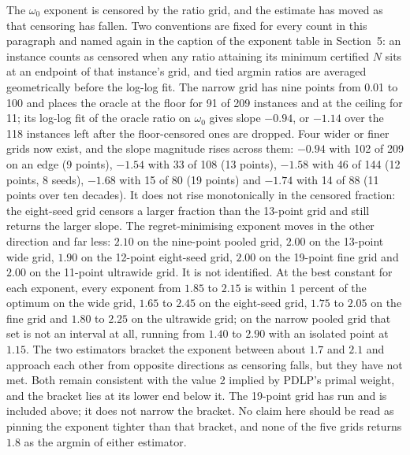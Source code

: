 The $\omega_0$ exponent is censored by the ratio grid, and the estimate has
moved as that censoring has fallen. Two conventions are fixed for every count in
this paragraph and named again in the caption of the exponent table in
Section~5: an instance counts as censored when any ratio attaining its minimum
certified $N$ sits at an endpoint of that instance's grid, and tied argmin
ratios are averaged geometrically before the log-log fit. The narrow grid has
nine points from 0.01 to 100 and places the oracle at the floor for 91 of 209
instances and at the ceiling for 11; its log-log fit of the oracle ratio on
$\omega_0$ gives slope $-0.94$, or $-1.14$ over the 118 instances left after the
floor-censored ones are dropped. Four wider or finer grids now exist, and the
slope magnitude rises across them: $-0.94$ with 102 of 209 on an edge (9
points), $-1.54$ with 33 of 108 (13 points), $-1.58$ with 46 of 144 (12 points,
8 seeds), $-1.68$ with 15 of 80 (19 points) and $-1.74$ with 14 of 88 (11 points
over ten decades). It does not rise monotonically in the censored fraction: the
eight-seed grid censors a larger fraction than the 13-point grid and still
returns the larger slope. The regret-minimising exponent moves in the other
direction and far less: $2.10$ on the nine-point pooled grid, $2.00$ on the
13-point wide grid, $1.90$ on the 12-point eight-seed grid, $2.00$ on the
19-point fine grid and $2.00$ on the 11-point ultrawide grid. It is not
identified. At the best constant for each exponent, every exponent from $1.85$
to $2.15$ is within 1 percent of the optimum on the wide grid, $1.65$ to $2.45$
on the eight-seed grid, $1.75$ to $2.05$ on the fine grid and $1.80$ to $2.25$
on the ultrawide grid; on the narrow pooled grid that set is not an interval at
all, running from $1.40$ to $2.90$ with an isolated point at $1.15$. The two
estimators bracket the exponent between about $1.7$ and $2.1$ and approach each
other from opposite directions as censoring falls, but they have not met. Both
remain consistent with the value 2 implied by PDLP's primal weight, and the
bracket lies at its lower end below it. The 19-point grid has run and is
included above; it does not narrow the bracket. No claim here should be read as
pinning the exponent tighter than that bracket, and none of the five grids
returns $1.8$ as the argmin of either estimator.

